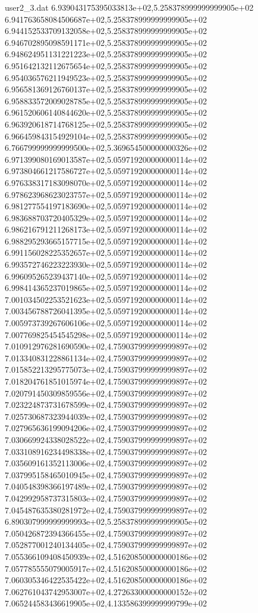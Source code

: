 \begin{filecontents}{user2_3.dat}
6.939043175395033813e+02,5.258378999999999905e+02
6.941763658084506687e+02,5.258378999999999905e+02
6.944152533709132058e+02,5.258378999999999905e+02
6.946702895098591171e+02,5.258378999999999905e+02
6.948624951131221223e+02,5.258378999999999905e+02
6.951642132112675654e+02,5.258378999999999905e+02
6.954036576211949523e+02,5.258378999999999905e+02
6.956581369126760137e+02,5.258378999999999905e+02
6.958833572009028785e+02,5.258378999999999905e+02
6.961520606140844620e+02,5.258378999999999905e+02
6.963920618714768125e+02,5.258378999999999905e+02
6.966459843154929104e+02,5.258378999999999905e+02
6.766799999999999500e+02,5.369654500000000326e+02
6.971399080169013587e+02,5.059719200000000114e+02
6.973804661217586727e+02,5.059719200000000114e+02
6.976338317183098070e+02,5.059719200000000114e+02
6.978623968623023757e+02,5.059719200000000114e+02
6.981277554197183690e+02,5.059719200000000114e+02
6.983688703720405329e+02,5.059719200000000114e+02
6.986216791211268173e+02,5.059719200000000114e+02
6.988295293665157715e+02,5.059719200000000114e+02
6.991156028225352657e+02,5.059719200000000114e+02
6.993572746223223930e+02,5.059719200000000114e+02
6.996095265239437140e+02,5.059719200000000114e+02
6.998414365237019865e+02,5.059719200000000114e+02
7.001034502253521623e+02,5.059719200000000114e+02
7.003456788726041395e+02,5.059719200000000114e+02
7.005973739267606106e+02,5.059719200000000114e+02
7.007769825454545298e+02,5.059719200000000114e+02
7.010912976281690590e+02,4.759037999999999897e+02
7.013340831228861134e+02,4.759037999999999897e+02
7.015852213295775073e+02,4.759037999999999897e+02
7.018204761851015974e+02,4.759037999999999897e+02
7.020791450309859556e+02,4.759037999999999897e+02
7.023224873731678599e+02,4.759037999999999897e+02
7.025730687323944039e+02,4.759037999999999897e+02
7.027965636199094206e+02,4.759037999999999897e+02
7.030669924338028522e+02,4.759037999999999897e+02
7.033108916234498338e+02,4.759037999999999897e+02
7.035609161352113006e+02,4.759037999999999897e+02
7.037995158465010945e+02,4.759037999999999897e+02
7.040548398366197489e+02,4.759037999999999897e+02
7.042992958737315803e+02,4.759037999999999897e+02
7.045487635380281972e+02,4.759037999999999897e+02
6.890307999999999993e+02,5.258378999999999905e+02
7.050426872394366455e+02,4.759037999999999897e+02
7.052877001240134405e+02,4.759037999999999897e+02
7.055366109408450939e+02,4.516208500000000186e+02
7.057785555079005917e+02,4.516208500000000186e+02
7.060305346422535422e+02,4.516208500000000186e+02
7.062761043742953007e+02,4.272633000000000152e+02
7.065244583436619905e+02,4.133586399999999799e+02

\end{filecontents}
